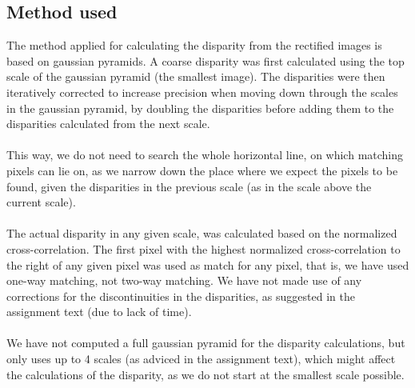 \documentclass[12pt,a4paper,oneside,final]{article}
\begin{document}
	\subsection{Method used}
	The method applied for calculating the disparity from the rectified images is based on gaussian pyramids. A coarse disparity was first calculated using the top scale of the gaussian pyramid (the smallest image). The disparities were then iteratively corrected to increase precision when moving down through the scales in the gaussian pyramid, by doubling the disparities before adding them to the disparities calculated from the next scale. \\\\
	This way, we do not need to search the whole horizontal line, on which matching pixels can lie on, as we narrow down the place where we expect the pixels to be found, given the disparities in the previous scale (as in the scale above the current scale).\\\\
	The actual disparity in any given scale, was calculated based on the normalized cross-correlation. The first pixel with the highest normalized cross-correlation to the right of any given pixel was used as match for any pixel, that is, we have used one-way matching, not two-way matching. We have not made use of any corrections for the discontinuities in the disparities, as suggested in the assignment text (due to lack of time). \\\\
	We have not computed a full gaussian pyramid for the disparity calculations, but only uses up to 4 scales (as adviced in the assignment text), which might affect the calculations of the disparity, as we do not start at the smallest scale possible.
	
\end{document}
